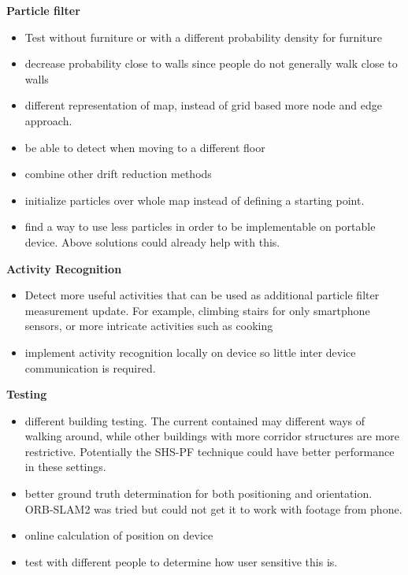 {\textbf{Particle filter}
\begin{itemize}
	\item Test without furniture or with a different probability density for furniture
	\item decrease probability close to walls since people do not generally walk close to walls
	\item different representation of map, instead of grid based more node and edge approach. 
	\item be able to detect when moving to a different floor
	\item combine other drift reduction methods
	\item initialize particles over whole map instead of defining a starting point.
	\item find a way to use less particles in order to be implementable on portable device. Above solutions could already help with this.
\end{itemize}

\textbf{Activity Recognition}
\begin{itemize}
	\item Detect more useful activities that can be used as additional particle filter measurement update. For example, climbing stairs for only smartphone sensors, or more intricate activities such as cooking
	\item implement activity recognition locally on device so little inter device communication is required.
\end{itemize}

\textbf{Testing}
\begin{itemize}
	\item different building testing. The current contained may different ways of walking around, while other buildings with more corridor structures are more restrictive. Potentially the SHS-PF technique could have better performance in these settings.
	\item better ground truth determination for both positioning and orientation. ORB-SLAM2 was tried but could not get it to work with footage from phone.
	\item online calculation of position on device
	\item test with different people to determine how user sensitive this is.
\end{itemize}}
